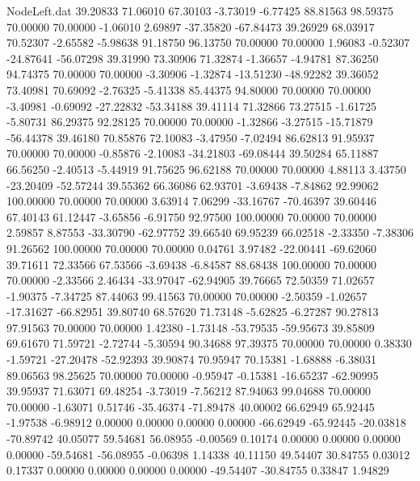 \begin{filecontents}{NodeLeft.dat}
  39.20833   71.06010   67.30103    -3.73019   -6.77425   88.81563   98.59375   70.00000   70.00000   -1.06010    2.69897  -37.35820  -67.84473
  39.26929   68.03917   70.52307    -2.65582   -5.98638   91.18750   96.13750   70.00000   70.00000    1.96083   -0.52307  -24.87641  -56.07298
  39.31990   73.30906   71.32874    -1.36657   -4.94781   87.36250   94.74375   70.00000   70.00000   -3.30906   -1.32874  -13.51230  -48.92282
  39.36052   73.40981   70.69092    -2.76325   -5.41338   85.44375   94.80000   70.00000   70.00000   -3.40981   -0.69092  -27.22832  -53.34188
  39.41114   71.32866   73.27515    -1.61725   -5.80731   86.29375   92.28125   70.00000   70.00000   -1.32866   -3.27515  -15.71879  -56.44378
  39.46180   70.85876   72.10083    -3.47950   -7.02494   86.62813   91.95937   70.00000   70.00000   -0.85876   -2.10083  -34.21803  -69.08444
  39.50284   65.11887   66.56250    -2.40513   -5.44919   91.75625   96.62188   70.00000   70.00000    4.88113    3.43750  -23.20409  -52.57244
  39.55362   66.36086   62.93701    -3.69438   -7.84862   92.99062  100.00000   70.00000   70.00000    3.63914    7.06299  -33.16767  -70.46397
  39.60446   67.40143   61.12447    -3.65856   -6.91750   92.97500  100.00000   70.00000   70.00000    2.59857    8.87553  -33.30790  -62.97752
  39.66540   69.95239   66.02518    -2.33350   -7.38306   91.26562  100.00000   70.00000   70.00000    0.04761    3.97482  -22.00441  -69.62060
  39.71611   72.33566   67.53566    -3.69438   -6.84587   88.68438  100.00000   70.00000   70.00000   -2.33566    2.46434  -33.97047  -62.94905
  39.76665   72.50359   71.02657    -1.90375   -7.34725   87.44063   99.41563   70.00000   70.00000   -2.50359   -1.02657  -17.31627  -66.82951
  39.80740   68.57620   71.73148    -5.62825   -6.27287   90.27813   97.91563   70.00000   70.00000    1.42380   -1.73148  -53.79535  -59.95673
  39.85809   69.61670   71.59721    -2.72744   -5.30594   90.34688   97.39375   70.00000   70.00000    0.38330   -1.59721  -27.20478  -52.92393
  39.90874   70.95947   70.15381    -1.68888   -6.38031   89.06563   98.25625   70.00000   70.00000   -0.95947   -0.15381  -16.65237  -62.90995
  39.95937   71.63071   69.48254    -3.73019   -7.56212   87.94063   99.04688   70.00000   70.00000   -1.63071    0.51746  -35.46374  -71.89478
  40.00002   66.62949   65.92445    -1.97538   -6.98912    0.00000    0.00000    0.00000    0.00000  -66.62949  -65.92445  -20.03818  -70.89742
  40.05077   59.54681   56.08955    -0.00569    0.10174    0.00000    0.00000    0.00000    0.00000  -59.54681  -56.08955   -0.06398    1.14338
  40.11150   49.54407   30.84755     0.03012    0.17337    0.00000    0.00000    0.00000    0.00000  -49.54407  -30.84755    0.33847    1.94829

\end{filecontents}
